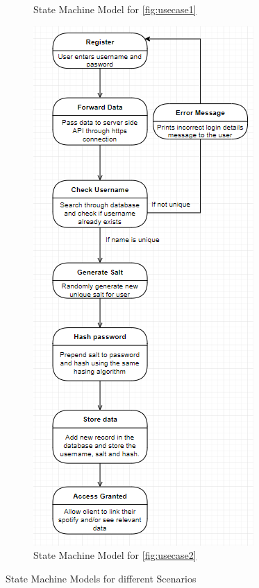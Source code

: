 \documentclass[10pt]{report}
\begin{document}
\begin{figure}[h]
{\begin{subfigure}{0.5\textwidth}
	\caption{State Machine Model for \ref{fig:usecase1}}
	\label{fig:statemach1}
\end{subfigure}%
\begin{subfigure}{0.5\textwidth}
	\centering	
	\includegraphics[width=1\linewidth]{statemach2.png}
	\caption{State Machine Model for \ref{fig:usecase2}}
	\label{fig:statemach2}
\end{subfigure}
}

\caption{State Machine Models for different Scenarios}
\label{fig:statemach}

\end{figure}
\end{document}
